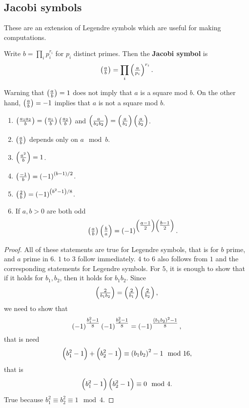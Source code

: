 \pagebreak

\subsection{Jacobi symbols}

These are an extension of Legendre symbols which are useful for making computations.

\begin{definition}
Write $ b = \prod_i p_i^{r_i} $ for $ p_i $ distinct primes. Then the \textbf{Jacobi symbol} is
$$ \jacobi{a}{b} = \prod_i \jacobi{a}{p_i}^{r_i}. $$
\end{definition}

Warning that $ \jacobi{a}{b} = 1 $ does not imply that $ a $ is a square mod $ b $. On the other hand, $ \jacobi{a}{b} = -1 $ implies that $ a $ is not a square mod $ b $.


\begin{lemma}
\hfill
\begin{enumerate}
\item $ \jacobi{a_1a_2}{b} = \jacobi{a_1}{b}\jacobi{a_2}{b} $ and $ \jacobi{a}{b_1b_2} = \jacobi{a}{b_1}\jacobi{a}{b_2} $.
\item $ \jacobi{a}{b} $ depends only on $ a \mod b $.
\item $ \jacobi{a^2}{b} = 1 $.
\item $ \jacobi{-1}{b} = \br{-1}^{\br{b - 1} / 2} $.
\item $ \jacobi{2}{b} = \br{-1}^{\br{b^2 - 1} / 8} $.
\item If $ a, b > 0 $ are both odd
$$ \jacobi{a}{b}\jacobi{b}{a} = \br{-1}^{\br{\tfrac{a - 1}{2}}\br{\tfrac{b - 1}{2}}}. $$
\end{enumerate}
\end{lemma}

\begin{proof}
All of these statements are true for Legendre symbols, that is for $ b $ prime, and $ a $ prime in $ 6 $. $ 1 $ to $ 3 $ follow immediately. $ 4 $ to $ 6 $ also follows from $ 1 $ and the corresponding statements for Legendre symbols. For $ 5 $, it is enough to show that if it holds for $ b_1, b_2 $, then it holds for $ b_1b_2 $. Since
$$ \jacobi{2}{b_1b_2} = \jacobi{2}{b_1}\jacobi{2}{b_2}, $$
we need to show that
$$ \br{-1}^{\tfrac{b_1^2 - 1}{8}}\br{-1}^{\tfrac{b_2^2 - 1}{8}} = \br{-1}^{\tfrac{\br{b_1b_2}^2 - 1}{8}}, $$
that is need
$$ \br{b_1^2 - 1} + \br{b_2^2 - 1} \equiv \br{b_1b_2}^2 - 1 \mod 16, $$
that is
$$ \br{b_1^2 - 1}\br{b_2^2 - 1} \equiv 0 \mod 4. $$
True because $ b_1^2 \equiv b_2^2 \equiv 1 \mod 4 $.
\end{proof}

